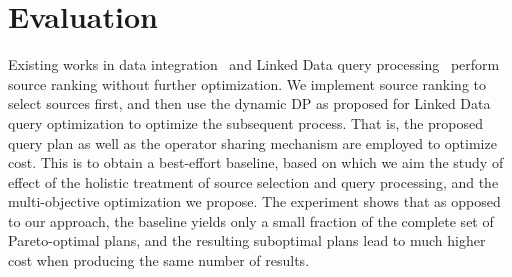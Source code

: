 \section{Evaluation}
\label{sec:eva}
Existing works in data integration~\cite{levy_querying_1996} and Linked Data query processing~\cite{harth_data_2010,ladwig_linked_2010} perform source ranking
without further optimization. We implement source ranking to select sources first, and then use the dynamic DP as proposed for Linked Data query optimization to optimize
the subsequent process. That is, the proposed query plan as well as
the operator sharing mechanism are employed to optimize cost. This is
to obtain a best-effort baseline, based on which we aim the study of
effect of the holistic treatment of source selection and query
processing, and the multi-objective optimization we propose. The
experiment shows that as opposed to our approach, the baseline yields
only a small fraction of the complete set of Pareto-optimal plans, and
the resulting suboptimal plans lead to much higher cost when producing
the same number of results.










